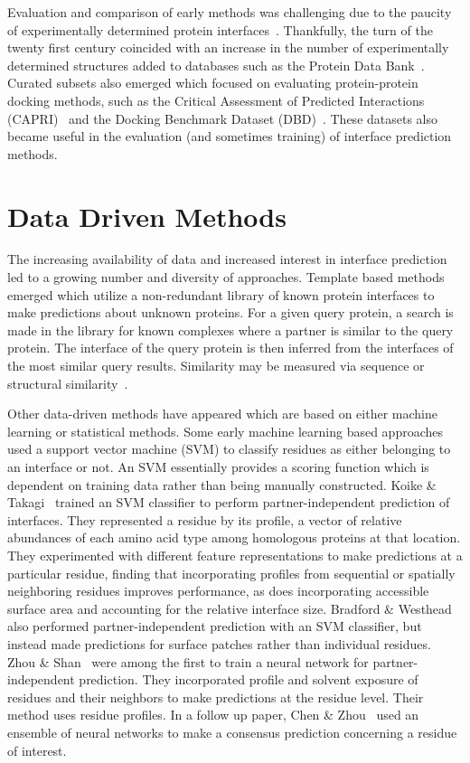Evaluation and comparison of early methods was challenging due to the paucity of experimentally determined protein interfaces~\cite{esmaielbeiki2015}.
Thankfully, the turn of the twenty first century coincided with an increase in the number of experimentally determined structures added to databases such as the Protein Data Bank~\cite{berman2000}.
Curated subsets also emerged which focused on evaluating protein-protein docking methods, such as the Critical Assessment of Predicted Interactions (CAPRI)~\cite{janin2003} and the Docking Benchmark Dataset (DBD)~\cite{chen2002}.
These datasets also became useful in the evaluation (and sometimes training) of interface prediction methods.

\section{Data Driven Methods}
	
The increasing availability of data and increased interest in interface prediction led to a growing number and diversity of approaches.
Template based methods emerged which utilize a non-redundant library of known protein interfaces to make predictions about unknown proteins.
For a given query protein, a search is made in the library for known complexes where a partner is similar to the query protein.
The interface of the query protein is then inferred from the interfaces of the most similar query results.
Similarity may be measured via sequence or structural similarity~\cite{esmaielbeiki2015}.

Other data-driven methods have appeared which are based on either machine learning or statistical methods.
Some early machine learning based approaches used a support vector machine (SVM) to classify residues as either belonging to an interface or not.
An SVM essentially provides a scoring function which is dependent on training data rather than being manually constructed.
Koike \& Takagi~\cite{koike2004} trained an SVM classifier to perform partner-independent prediction of interfaces.
They represented a residue by its profile, a vector of relative abundances of each amino acid type among homologous proteins at that location.
They experimented with different feature representations to make predictions at a particular residue, finding that incorporating profiles from sequential or spatially neighboring residues improves performance, as does incorporating accessible surface area and accounting for the relative interface size.
Bradford \& Westhead~\cite{bradford2004} also performed partner-independent prediction with an SVM classifier, but instead made predictions for surface patches rather than individual residues.
Zhou \& Shan~\cite{zhou2001} were among the first to train a neural network for partner-independent prediction.
They incorporated profile and solvent exposure of residues and their neighbors to make predictions at the residue level.
Their method uses residue profiles.
In a follow up paper, Chen \& Zhou~\cite{chen2005} used an ensemble of neural networks to make a consensus prediction concerning a residue of interest.

